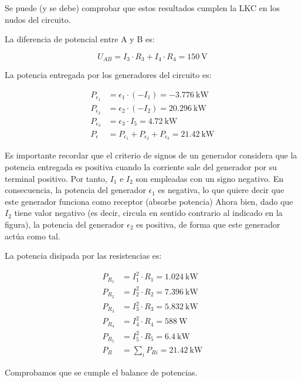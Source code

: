 \documentclass[10pt]{article}
\begin{document}
Se puede (y se debe) comprobar que estos resultados cumplen la LKC en los nudos del circuito.

La diferencia de potencial entre A y B es:

\[
  U_{AB} = I_3 \cdot R_3 + I_4 \cdot R_4 = \SI{150}{\volt}
\]

La potencia entregada por los generadores del circuito es:

\begin{align*}
  P_{\epsilon_1} &= \epsilon_1 \cdot (-I_1) = -\SI{3,776}{\kilo\watt}\\
  P_{\epsilon_2} &= \epsilon_2 \cdot (-I_2) = \SI{20,296}{\kilo\watt}\\
  P_{\epsilon_3} &= \epsilon_3 \cdot I_5 = \SI{4,72}{\kilo\watt}\\
  P_\epsilon &= P_{\epsilon_1} + P_{\epsilon_2} + P_{\epsilon_3} = \SI{21,42}{\kilo\watt}  
\end{align*}

Es importante recordar que el criterio de signos de un generador considera que la potencia entregada es positiva cuando la corriente sale del generador por su terminal positivo. Por tanto, $I_1$ e $I_2$ son empleadas con un signo negativo. En consecuencia, la potencia del generador $\epsilon_1$ es negativa, lo que quiere decir que este generador funciona como receptor (absorbe potencia) Ahora bien, dado que $I_2$ tiene valor negativo (es decir, circula en sentido contrario al indicado en la figura), la potencia del generador $\epsilon_2$ es positiva, de forma que este generador actúa como tal.

La potencia disipada por las resistencias es:

\begin{align*}
  P_{R_1} &= I_1^2 \cdot R_1 = \SI{1,024}{\kilo\watt}\\
  P_{R_2} &= I_2^2 \cdot R_2 = \SI{7,396}{\kilo\watt}\\
  P_{R_3} &= I_3^2 \cdot R_3 = \SI{5,832}{\kilo\watt}\\
  P_{R_4} &= I_4^2 \cdot R_4 = \SI{588}{\watt}\\
  P_{R_5} &= I_5^2 \cdot R_5 = \SI{6,4}{\kilo\watt}\\
  P_R &= \sum_i P_{Ri} = \SI{21,42}{\kilo\watt}  
\end{align*}

Comprobamos que se cumple el balance de potencias.

\clearpage

\section{}
\end{document}
